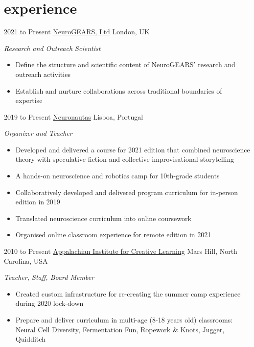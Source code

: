 \documentclass[10pt, a4]{friggeri-cv}
\begin{document}
\section{experience}

\begin{entrylist}
  \entry
    {2021 to Present}
    {\href{https://neurogears.org/}{NeuroGEARS, Ltd}}
    {London, UK}
    {\emph{Research and Outreach Scientist}
	\begin{itemize}
		\item Define the structure and scientific content of NeuroGEARS' research and outreach activities
		\item Establish and nurture collaborations across traditional boundaries of expertise
	\end{itemize}
	}
\entry
{2019 to Present}
{\href{https://neuronautas.github.io/}{Neuronautas}}
{Lisboa, Portugal}
{\emph{Organizer and Teacher}
\begin{itemize}
	\item Developed and delivered a course for 2021 edition that combined neuroscience theory with speculative fiction and collective improvisational storytelling
	\item A hands-on neuroscience and robotics camp for 10th-grade students
	\item Collaboratively developed and delivered program curriculum for in-person edition in 2019
	\item Translated neuroscience curriculum into online coursework 
	\item Organised online classroom experience for remote edition in 2021
\end{itemize}
}
\entry
{2010 to Present}
{\href{http://www.appalachianinstitute.org/}{Appalachian Institute for Creative Learning}}
{Mars Hill, North Carolina, USA}
{\emph{Teacher, Staff, Board Member}
\begin{itemize}
	\item Created custom infrastructure for re-creating the summer camp experience during 2020 lock-down
	\item Prepare and deliver curriculum in multi-age (8-18 years old) classrooms: Neural Cell Diversity, Fermentation Fun, Ropework \& Knots, Jugger, Quidditch
\end{itemize}
}


\end{entrylist}
\end{document}
